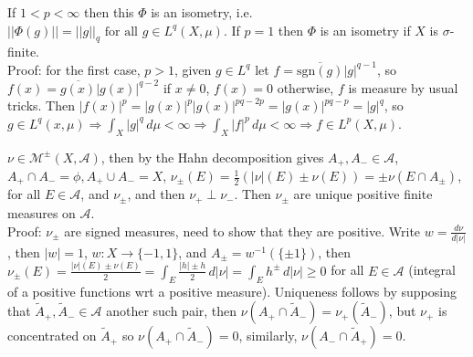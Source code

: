 \documentclass[12pt]{article}
\newcommand{\partset}[1]{ \mathcal{P}^{*}(#1) }
\newcommand{\fall}[0] { \textrm{ for all } }
\newcommand{\nats}[0] { \mathbb{N}}
\newcommand{\A}[0] { \mathcal{A} }
\newcommand{\M}[0] { \mathcal{M} }
\newcommand{\rimply}[0] { \Rightarrow }
\newcommand{\rarw}[0] { \rightarrow }
\begin{document}
If $1 < p < \infty$ then this $\Phi$ is an isometry, i.e. $||\Phi(g)|| = ||g||_q \fall g \in L^q(X, \mu)$. If $p=1$ then $\Phi$ is an isometry if $X$ is $\sigma$-finite. \\

\noindent
Proof: for the first case, $p > 1$, given $g \in L^q$ let $f = \overline{\textrm{sgn}(g)} |g|^{q-1}$, so $ f(x) = \overline{g(x)} |g(x)|^{q-2}$ if $x \not = 0$, $f(x) = 0$ otherwise, $f$ is measure by usual tricks. Then $|f(x)|^p = |g(x)|^p |g(x)|^{pq-2p} = |g(x)|^{pq-p} = |g|^q$, so $g \in L^q(x, \mu) \rimply \int_X |g|^q \, d\mu  < \infty \rimply \int_X |f|^p \, d\mu < \infty \rimply f \in L^p(X, \mu)$. 












\break


$\nu \in \M^\pm(X, \A)$, then by the Hahn decomposition gives $A_+, A_- \in \A$, $A_+ \cap A_- = \phi, A_+ \cup A_- = X$, $\nu_\pm(E) = \frac{1}{2} \left( |\nu|(E) \pm \nu(E) \right) =  \pm \nu( E \cap A_\pm)$, for all $E \in \A$, and $\nu_\pm$, and then $\nu_+ \perp \nu_-$. Then $\nu_\pm$ are unique positive finite measures on $\A$. \\

\noindent
Proof: $\nu_\pm$ are signed measures, need to show that they are positive. Write $w = \frac{d\nu}{d|\nu|}$, then $|w| = 1$, $w:X \rarw \{-1,1\}$, and $A_\pm = w^{-1}(\{\pm 1\})$, then 
$\nu_\pm(E) = \frac{|\nu|(E) \pm \nu(E)}{2} = \int_E \frac{|h| \pm h}{2} \, d|\nu| = \int_E h^\pm \, d|\nu| \ge 0$ for all $E \in \A$ (integral of a positive functions wrt a positive measure). Uniqueness follows by supposing that $\tilde{A}_+, \tilde{A}_- \in \A$ another such pair, then $\nu(A_+ \cap \tilde{A}_-) = \nu_+(\tilde{A}_-)$, but $\nu_+$ is concentrated on $\tilde{A}_+$ so $\nu(A_+ \cap \tilde{A}_-) = 0$, similarly, $\nu(A_- \cap \tilde{A}_+) = 0$. \\

\end{document}
